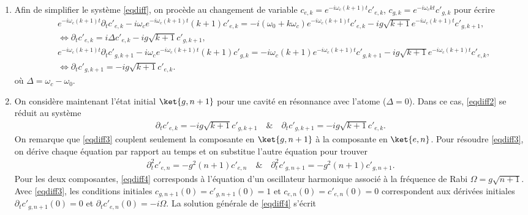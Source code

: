 {\begin{enumerate}
    \item Afin de simplifier le système \eqref{eqdiff}, on procède au changement de variable $c_{e, k} =  e^{-i\omega_c (k+1) t} c'_{e, k}$, $c_{g, k} =  e^{-i\omega_c k t} c'_{g, k}$ pour écrire 
    \begin{align}
        &e^{-i\omega_c (k+1) t}\partial_t{c}'_{e, k} - i\omega_c e^{-i\omega_c (k+1) t} (k+1) {c}'_{e, k} = - i (\omega_0 + k \omega_c) e^{-i\omega_c (k+1) t} c'_{e, k} - ig \sqrt{k+1}e^{-i\omega_c (k+1) t} c'_{g, k+1},\nonumber\\
        &\iff \partial_t{c}'_{e, k}  = i\Delta c'_{e, k} - ig \sqrt{k+1} c'_{g, k+1}, \nonumber \\
        &e^{-i\omega_c (k+1) t} \partial_t{c}'_{g, k+1} - i\omega_c e^{-i\omega_c (k+1) t} (k+1)  c'_{g, k} = - i\omega_c (k+1) e^{-i\omega_c (k+1) t} c'_{g, k+1} - ig \sqrt{k+1} e^{-i\omega_c (k+1) t} c'_{e, k}, \nonumber\\
        &\iff \partial_t{c}'_{g, k+1}  = - ig \sqrt{k+1}  c'_{e, k}
        .\label{eqdiff2}
     \end{align} 
     où $\Delta = \omega_c - \omega_0$.
    \item On considère maintenant l'état initial $\ket{g, n+1}$ pour une cavité en résonnance avec l'atome ($\Delta = 0$). Dans ce cas, \eqref{eqdiff2} se réduit au système 
    \begin{align}
         \partial_t{c}'_{e, k}  = - ig \sqrt{k+1} c'_{g, k+1}\quad \& \quad \partial_t{c}'_{g, k+1}  = - ig \sqrt{k+1}  c'_{e, k}
        .\label{eqdiff3}
     \end{align} 
    On remarque que \eqref{eqdiff3} couplent seulement la composante en $\ket{g, n+1}$ à la composante en $\ket{e, n}$. Pour résoudre \eqref{eqdiff3}, on dérive chaque équation par rapport au temps et on substitue l'autre équation pour trouver 
    \begin{align}
        \partial_t^2 {c}'_{e, n}  = -g^2 (n+1)  c'_{e, n} \quad \& \quad \partial_t^2 {c}'_{g, n+1}  = -g^2 (n+1)  c'_{g, n+1} 
       .\label{eqdiff4}
    \end{align} 
    Pour les deux composantes, \eqref{eqdiff4} corresponds à l'équation d'un oscillateur harmonique associé à la fréquence de Rabi $\Omega = g \sqrt{n+1}$. Avec \eqref{eqdiff3}, les conditions initiales $c_{g, n+1}(0) = c'_{g, n+1}(0) = 1$ et $c_{e, n}(0) = c'_{e, n}(0) = 0$ correspondent  aux dérivées initiales $\partial_t c'_{g, n+1}(0) = 0$ et $\partial_t c'_{e, n}(0) = -i\Omega$. La solution générale de \eqref{eqdiff4} s'écrit 
    \begin{align}

\end{align}
\end{enumerate}}
